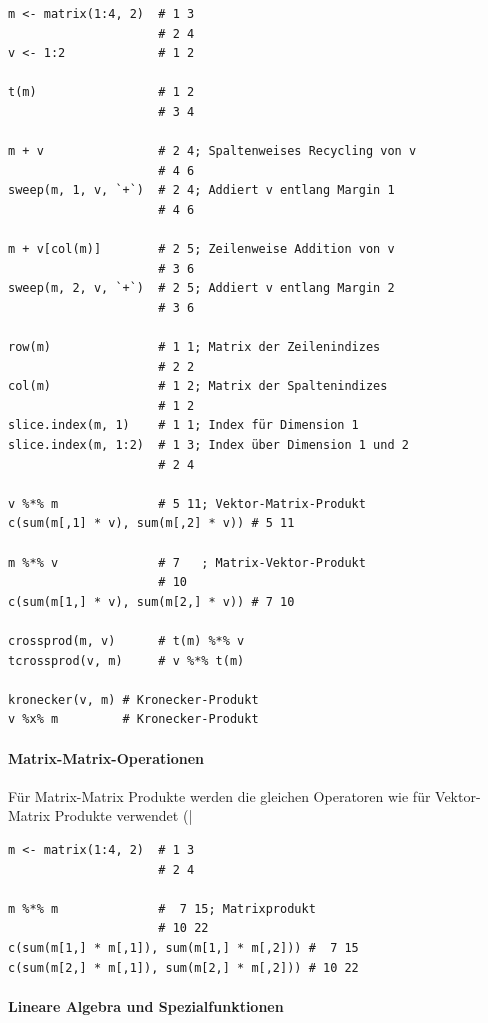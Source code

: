 \documentclass[10pt,twocolumn]{scrartcl}
\renewcommand{\lstinline}{\mycoloredinline}
\begin{document}
\begin{lstlisting}
m <- matrix(1:4, 2)  # 1 3
                     # 2 4
v <- 1:2             # 1 2

t(m)                 # 1 2
                     # 3 4

m + v                # 2 4; Spaltenweises Recycling von v
                     # 4 6
sweep(m, 1, v, `+`)  # 2 4; Addiert v entlang Margin 1
                     # 4 6

m + v[col(m)]        # 2 5; Zeilenweise Addition von v
                     # 3 6
sweep(m, 2, v, `+`)  # 2 5; Addiert v entlang Margin 2
                     # 3 6

row(m)               # 1 1; Matrix der Zeilenindizes
                     # 2 2
col(m)               # 1 2; Matrix der Spaltenindizes
                     # 1 2
slice.index(m, 1)    # 1 1; Index für Dimension 1
slice.index(m, 1:2)  # 1 3; Index über Dimension 1 und 2
                     # 2 4

v %*% m              # 5 11; Vektor-Matrix-Produkt
c(sum(m[,1] * v), sum(m[,2] * v)) # 5 11

m %*% v              # 7   ; Matrix-Vektor-Produkt
                     # 10
c(sum(m[1,] * v), sum(m[2,] * v)) # 7 10

crossprod(m, v)      # t(m) %*% v
tcrossprod(v, m)     # v %*% t(m)

kronecker(v, m) # Kronecker-Produkt
v %x% m         # Kronecker-Produkt
\end{lstlisting}

\paragraph{Matrix-Matrix-Operationen}

Für Matrix-Matrix Produkte werden die gleichen Operatoren wie für Vektor-Matrix Produkte verwendet (\lstinline|%*%|, \lstinline|crossprod()|, \lstinline|tcrossprod()|).
\begin{lstlisting}
m <- matrix(1:4, 2)  # 1 3
                     # 2 4

m %*% m              #  7 15; Matrixprodukt
                     # 10 22
c(sum(m[1,] * m[,1]), sum(m[1,] * m[,2])) #  7 15
c(sum(m[2,] * m[,1]), sum(m[2,] * m[,2])) # 10 22
\end{lstlisting}


\paragraph{Lineare Algebra und Spezialfunktionen}
\end{document}

